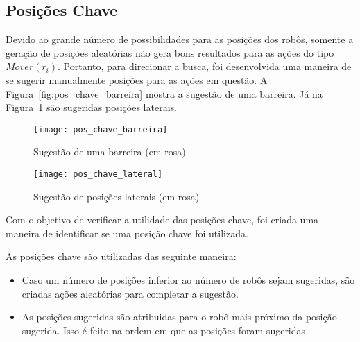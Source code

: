 \subsection{Posições Chave}\label{subsec:pos_chave}

Devido ao grande número de possibilidades para
as posições dos robôs, somente a geração de
posições aleatórias não gera bons resultados
para as ações do tipo $Mover(r_i)$. Portanto,
para direcionar a busca, foi desenvolvida uma
maneira de se sugerir manualmente posições para
as ações em questão. A Figura~\ref{fig:pos_chave_barreira}
mostra a sugestão de uma barreira. Já na
Figura~\ref{fig:pos_chave_lateral} são sugeridas
posições laterais.

\begin{figure}[H]
  \centering
  \texttt{[image: pos\_chave\_barreira]}
  \caption{Sugestão de uma barreira (em rosa)}\label{fig:pos_chave_barreira}
  \texttt{[image: pos\_chave\_lateral]}
  \caption{Sugestão de posições laterais (em rosa)}\label{fig:pos_chave_lateral}
\end{figure}

Com o objetivo de verificar a utilidade das posições chave,
foi criada uma maneira de identificar se uma posição chave
foi utilizada.

As posições chave são utilizadas das seguinte maneira:
\begin{itemize}
  \item Caso um número de posições inferior ao número de
        robôs sejam sugeridas, são criadas ações aleatórias
        para completar a sugestão.
  \item As posições sugeridas são atribuidas para o robô
        mais próximo da posição sugerida. Isso é feito
        na ordem em que as posições foram sugeridas
\end{itemize}

